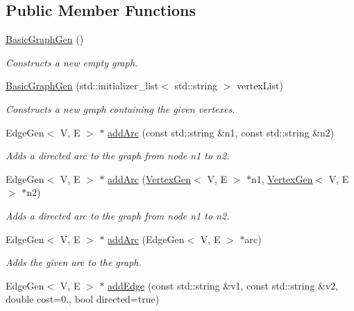\subsection*{Public Member Functions}
\begin{DoxyCompactItemize}
\item 
\mbox{\hyperlink{classBasicGraphGen_a9d6eaee0a2e8ea6de432f815463813fa}{Basic\+Graph\+Gen}} ()
\begin{DoxyCompactList}\small\item\em Constructs a new empty graph. \end{DoxyCompactList}\item 
\mbox{\hyperlink{classBasicGraphGen_aa8af075f69d803e4a813e4d348150fc5}{Basic\+Graph\+Gen}} (std\+::initializer\+\_\+list$<$ std\+::string $>$ vertex\+List)
\begin{DoxyCompactList}\small\item\em Constructs a new graph containing the given vertexes. \end{DoxyCompactList}\item 
Edge\+Gen$<$ V, E $>$ $\ast$ \mbox{\hyperlink{classGraph_aad2e9fedd7110ae2fb6873c5e2d29941}{add\+Arc}} (const std\+::string \&n1, const std\+::string \&n2)
\begin{DoxyCompactList}\small\item\em Adds a directed arc to the graph from node n1 to n2. \end{DoxyCompactList}\item 
Edge\+Gen$<$ V, E $>$ $\ast$ \mbox{\hyperlink{classGraph_a7280d3cd76bab82df392ba91ed5257c6}{add\+Arc}} (\mbox{\hyperlink{classVertexGen}{Vertex\+Gen}}$<$ V, E $>$ $\ast$n1, \mbox{\hyperlink{classVertexGen}{Vertex\+Gen}}$<$ V, E $>$ $\ast$n2)
\begin{DoxyCompactList}\small\item\em Adds a directed arc to the graph from node n1 to n2. \end{DoxyCompactList}\item 
Edge\+Gen$<$ V, E $>$ $\ast$ \mbox{\hyperlink{classGraph_aa1b6553e579c03260253a2d731668dfa}{add\+Arc}} (Edge\+Gen$<$ V, E $>$ $\ast$arc)
\begin{DoxyCompactList}\small\item\em Adds the given arc to the graph. \end{DoxyCompactList}\item 
Edge\+Gen$<$ V, E $>$ $\ast$ \mbox{\hyperlink{classBasicGraphGen_a624c45bedf3986073b0f8a40ab4d85c2}{add\+Edge}} (const std\+::string \&v1, const std\+::string \&v2, double cost=0., bool directed=true)

\end{DoxyCompactItemize}
